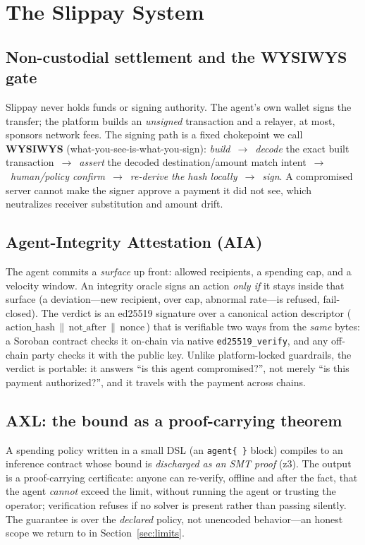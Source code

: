 \documentclass[11pt]{article}
\begin{document}
\section{The Slippay System}
\label{sec:system}

\subsection{Non-custodial settlement and the WYSIWYS gate}
Slippay never holds funds or signing authority. The agent's own wallet signs the transfer; the
platform builds an \emph{unsigned} transaction and a relayer, at most, sponsors network fees. The
signing path is a fixed chokepoint we call \textbf{WYSIWYS} (what-you-see-is-what-you-sign):
\emph{build}~$\rightarrow$~\emph{decode} the exact built transaction~$\rightarrow$~\emph{assert}
the decoded destination/amount match intent~$\rightarrow$~\emph{human/policy
confirm}~$\rightarrow$~\emph{re-derive the hash locally}~$\rightarrow$~\emph{sign}. A
compromised server cannot make the signer approve a payment it did not see, which neutralizes
receiver substitution and amount drift.

\subsection{Agent-Integrity Attestation (AIA)}
The agent commits a \emph{surface} up front: allowed recipients, a spending cap, and a velocity
window. An integrity oracle signs an action \emph{only if} it stays inside that surface (a
deviation---new recipient, over cap, abnormal rate---is refused, fail-closed). The verdict is an
ed25519 signature over a canonical action descriptor (\,$\text{action\_hash}\,\|\,
\text{not\_after}\,\|\,\text{nonce}$\,) that is verifiable two ways from the \emph{same} bytes: a
Soroban contract checks it on-chain via native \texttt{ed25519\_verify}, and any off-chain party
checks it with the public key. Unlike platform-locked guardrails, the verdict is portable: it
answers ``is this agent compromised?'', not merely ``is this payment authorized?'', and it
travels with the payment across chains.

\subsection{AXL: the bound as a proof-carrying theorem}
A spending policy written in a small DSL (an \texttt{agent\{\,\}} block) compiles to an inference
contract whose bound is \emph{discharged as an SMT proof} (z3). The output is a proof-carrying
certificate: anyone can re-verify, offline and after the fact, that the agent \emph{cannot}
exceed the limit, without running the agent or trusting the operator; verification refuses if no
solver is present rather than passing silently. The guarantee is over the \emph{declared} policy,
not unencoded behavior---an honest scope we return to in Section~\ref{sec:limits}.
\end{document}
